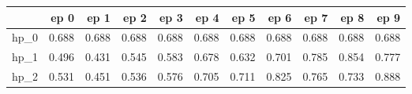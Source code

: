 \begin{tabular}{lrrrrrrrrrr}
\toprule
{} &   ep 0 &   ep 1 &   ep 2 &   ep 3 &   ep 4 &   ep 5 &   ep 6 &   ep 7 &   ep 8 &   ep 9 \\
\midrule
hp\_0 &  0.688 &  0.688 &  0.688 &  0.688 &  0.688 &  0.688 &  0.688 &  0.688 &  0.688 &  0.688 \\
hp\_1 &  0.496 &  0.431 &  0.545 &  0.583 &  0.678 &  0.632 &  0.701 &  0.785 &  0.854 &  0.777 \\
hp\_2 &  0.531 &  0.451 &  0.536 &  0.576 &  0.705 &  0.711 &  0.825 &  0.765 &  0.733 &  0.888 \\
\bottomrule
\end{tabular}
